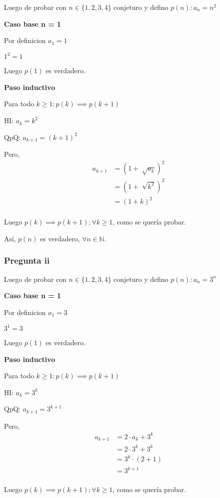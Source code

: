 Luego de probar con $ n \in \{ 1,2,3,4 \} $ conjeturo y defino $ p(n): a_n = n^2 $

\textbf{Caso base n = 1}

Por definicion $ a_1 = 1$

$ 1^2 = 1$

Luego $ p(1) $ es verdadero.

\textbf{Paso inductivo}

Para todo $k \geq 1: p(k) \implies p(k+1)$

HI: $ a_k = k^2$

QpQ: $ a_{k+1} = (k+1)^2$

Pero,
\begin{align*}
    a_{k+1} &= (1+\sqrt[]{a_k})^2 \\
    &= (1+\sqrt[]{k^2})^2 \\
    &= (1+k)^2 \\
\end{align*}

Luego $p(k) \implies p(k+1); \forall k \geq 1$, como se quería probar.

Así, $p(n)$ es verdadero, $\forall n \in \mathbb{N}$.

\subsubsection{Pregunta ii}

Luego de probar con $ n \in \{ 1,2,3,4 \} $ conjeturo y defino $ p(n): a_n = 3^n $

\textbf{Caso base n = 1}

Por definicion $ a_1 = 3$

$ 3^1 = 3$

Luego $ p(1) $ es verdadero.

\textbf{Paso inductivo}

Para todo $k \geq 1: p(k) \implies p(k+1)$

HI: $ a_k = 3^k$

QpQ: $ a_{k+1} = 3^{k+1}$

Pero,
\begin{align*}
    a_{k+1} &= 2\cdot a_k + 3^k \\
    &= 2\cdot 3^k + 3^k \\
    &= 3^k\cdot (2+1) \\
    &= 3^{k+1} \\
\end{align*}

Luego $p(k) \implies p(k+1); \forall k \geq 1$, como se quería probar.


